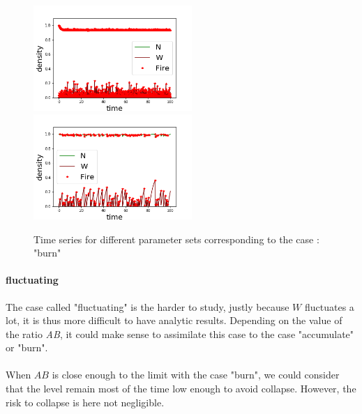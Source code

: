 \documentclass{article}
\begin{document}
\begin{figure}[h!]
\centering
\includegraphics[width=6cm]{continue_1.png}
\includegraphics[width=6cm]{continue_2.png}
\caption{Time series for different parameter sets corresponding to the case : "burn"}
\end{figure}




\newpage
\paragraph{fluctuating \\}
The case called "fluctuating" is the harder to study, justly because $W$ fluctuates a lot, it is thus more difficult to have analytic results. Depending on the value of the ratio \textit{AB}, it could make sense to assimilate this case to the case "accumulate" or "burn".


\paragraph{}
When $AB$ is close enough to the limit with the case "burn", we could consider that the level remain most of the time low enough to avoid collapse. However, the risk to collapse is here not negligible.
\end{document}
